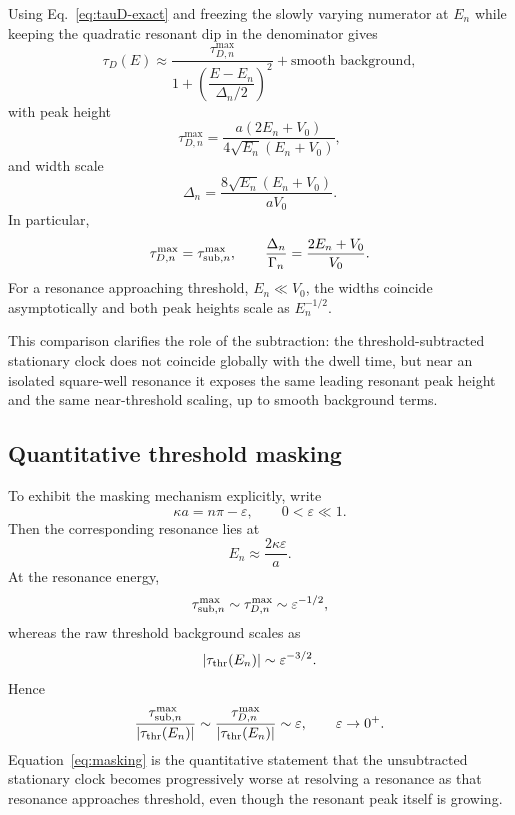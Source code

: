 \documentclass[aps,pra,preprint,notitlepage,nofootinbib]{revtex4-2}
\begin{document}
Using Eq.~\eqref{eq:tauD-exact} and freezing the slowly varying numerator at $E_n$ while keeping the quadratic resonant dip in the denominator gives
\begin{equation}
\tau_D(E)\approx
\frac{\tau_{D,n}^{\max}}
{1+\left(\dfrac{E-E_n}{\Delta_n/2}\right)^2}
+\text{smooth background},
\label{eq:tauD-Lorentz}
\end{equation}
with peak height
\begin{equation}
\tau_{D,n}^{\max}=
\frac{a(2E_n+V_0)}{4\sqrt{E_n}(E_n+V_0)},
\label{eq:tauD-peak}
\end{equation}
and width scale
\begin{equation}
\Delta_n=
\frac{8\sqrt{E_n}(E_n+V_0)}{aV_0}.
\label{eq:Delta-def}
\end{equation}
In particular,
\begin{equation}
\tau_{D,n}^{\max}=\tau_{{\rm sub},n}^{\max},
\qquad
\frac{\Delta_n}{\Gamma_n}=\frac{2E_n+V_0}{V_0}.
\label{eq:peak-relations}
\end{equation}
For a resonance approaching threshold, $E_n\ll V_0$, the widths coincide asymptotically and both peak heights scale as $E_n^{-1/2}$.

This comparison clarifies the role of the subtraction: the threshold-subtracted stationary clock does not coincide globally with the dwell time, but near an isolated square-well resonance it exposes the same leading resonant peak height and the same near-threshold scaling, up to smooth background terms.

\subsection{Quantitative threshold masking}

To exhibit the masking mechanism explicitly, write
\begin{equation}
\kappa a=n\pi-\varepsilon,
\qquad
0<\varepsilon\ll1.
\label{eq:epsilon-def}
\end{equation}
Then the corresponding resonance lies at
\begin{equation}
E_n\approx \frac{2\kappa\varepsilon}{a}.
\label{eq:En-nearthresh}
\end{equation}
At the resonance energy,
\begin{equation}
\tau_{{\rm sub},n}^{\max}\sim \tau_{D,n}^{\max}\sim \varepsilon^{-1/2},
\label{eq:peak-scaling}
\end{equation}
whereas the raw threshold background scales as
\begin{equation}
|\tau_{\rm thr}(E_n)|\sim \varepsilon^{-3/2}.
\label{eq:thr-scaling}
\end{equation}
Hence
\begin{equation}
\frac{\tau_{{\rm sub},n}^{\max}}{|\tau_{\rm thr}(E_n)|}
\sim
\frac{\tau_{D,n}^{\max}}{|\tau_{\rm thr}(E_n)|}
\sim \varepsilon,
\qquad
\varepsilon\to0^+.
\label{eq:masking}
\end{equation}
Equation~\eqref{eq:masking} is the quantitative statement that the unsubtracted stationary clock becomes progressively worse at resolving a resonance as that resonance approaches threshold, even though the resonant peak itself is growing.
\end{document}
